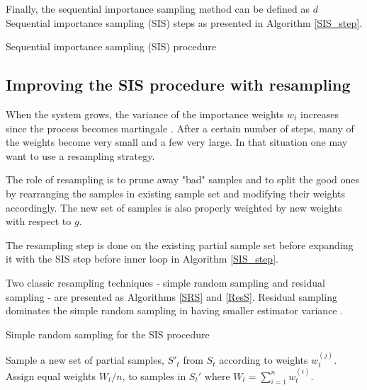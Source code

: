 \documentclass[times, utf8, diplomski]{fer}
\begin{document}
Finally, the sequential importance sampling method can be defined as $d$ Sequential importance sampling (SIS) steps as presented in Algorithm \ref{SIS_step}. 

\vspace{5mm}
\begin{algorithm}[h]
\caption{Sequential importance sampling (SIS) procedure}
\label{SIS_step}
\vspace{5mm}
\end{algorithm}
\vspace{5mm}

\subsection{Improving the SIS procedure with resampling}
When the system grows, the variance of the importance weights $w_t$ increases since the process becomes martingale \cite{Kong94}. After a certain number of steps, many of the weights become very small and a few very large.
In that situation one may want to use a resampling strategy. 

The role of resampling   is to prune away "bad" samples and to split the good ones by rearranging the samples in existing sample set and modifying their weights accordingly. The new set of samples is also properly weighted by new weights with respect to $g$.

The resampling step is done on the existing partial sample set before expanding it with the SIS step before inner loop in Algorithm \ref{SIS_step}.

Two classic resampling techniques - simple random sampling and residual sampling - are presented as Algorithms \ref{SRS} and \ref{ResS}. 
Residual sampling dominates the simple random sampling in having smaller estimator variance \cite{Liu}.

\begin{algorithm}
\caption{Simple random sampling for the SIS procedure}
\label{SRS}
Sample a new set of partial samples, $S'_t$ from $S_t$ according to  weights $w_t^{(j)}$.\\
Assign equal weights $W_t / n$, to samples in $S_t'$ where $W_t = \sum_{i = 1}^{n} w_t^{(i)}$.\\
\end{algorithm}
\end{document}
